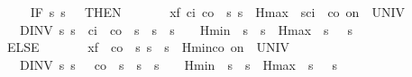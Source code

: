 \documentclass[envcountsame]{llncs}
\begin{document}
\begin{example}
\begin{isabellebody}
\ \ \ \ %
\isanewline
\ \ \ \ {\isacharparenleft}IF\ {\isacharparenleft}{\isasymlambda}s{\isachardot}\ s{\isachardollar}{}\ {\isacharequal}\ {}{\isacharparenright}\ THEN\ \isanewline
\ \ \ \ \ \ {\isacharparenleft}x{\isasymacute}{\isacharequal}{\isacharparenleft}f\ c\isactrlsub i\ c\isactrlsub o{\isacharparenright}\ {\isacharampersand}\ {\isacharparenleft}{\isasymlambda}s{\isachardot}\ s{\isachardollar}{}\ {\isasymle}\ {\isacharparenleft}Hmax\ {\isacharminus}\ s{\isachardollar}{}{\isacharparenright}{\isacharslash}{\isacharparenleft}c\isactrlsub i\ {\isacharminus}\ c\isactrlsub o{\isacharparenright}{\isacharparenright}\ on\ {\isacharbraceleft}{}{\isachardot}{\isachardot}{\isasymtau}{\isacharbraceright}\ UNIV\ {\isacharat}\ {}\isanewline
\ \ \ \ \ \ \ DINV\ {\isacharparenleft}{\isasymlambda}s{\isachardot}\ s{\isachardollar}{}\ {\isacharequal}\ {\isacharparenleft}{\isacharparenleft}c\isactrlsub i\ {\isacharminus}\ c\isactrlsub o{\isacharparenright}{\isacharparenright}\ {\isacharasterisk}\ s{\isachardollar}{}\ {\isacharplus}\ s{\isachardollar}{}\ {\isasymand}\ s{\isachardollar}{}\ {\isasymge}\ {}\ {\isasymand}\ Hmin\ {\isasymle}\ s{\isachardollar}{}\ {\isasymand}\ s{\isachardollar}{}\ {\isasymle}\ Hmax\ {\isasymand}\ {\isacharparenleft}s{\isachardollar}{}\ {\isacharequal}{}\ {\isasymor}\ s{\isachardollar}{}\ {\isacharequal}\ {}{\isacharparenright}{\isacharparenright}{\isacharparenright}\ \isanewline
\ \ \ \ \ ELSE\ \isanewline
\ \ \ \ \ \ {\isacharparenleft}x{\isasymacute}{\isacharequal}{\isacharparenleft}f\ {}\ c\isactrlsub o{\isacharparenright}\ {\isacharampersand}\ {\isacharparenleft}{\isasymlambda}s{\isachardot}\ s{\isachardollar}{}\ {\isasymle}\ {\isacharparenleft}s{\isachardollar}{}\ {\isacharminus}\ Hmin{\isacharparenright}{\isacharslash}c\isactrlsub o{\isacharparenright}\ on\ {\isacharbraceleft}{}{\isachardot}{\isachardot}{\isasymtau}{\isacharbraceright}\ UNIV\ {\isacharat}\ {}\isanewline
\ \ \ \ \ \ \ DINV\ {\isacharparenleft}{\isasymlambda}s{\isachardot}\ s{\isachardollar}{}\ {\isacharequal}\ {\isacharparenleft}{\isacharminus}\ c\isactrlsub o{\isacharparenright}\ {\isacharasterisk}\ s{\isachardollar}{}\ {\isacharplus}\ s{\isachardollar}{}\ {\isasymand}\ s{\isachardollar}{}\ {\isasymge}\ {}\ {\isasymand}\ Hmin\ {\isasymle}\ s{\isachardollar}{}\ {\isasymand}\ s{\isachardollar}{}\ {\isasymle}\ Hmax\ {\isasymand}\ {\isacharparenleft}s{\isachardollar}{}\ {\isacharequal}{}\ {\isasymor}\ s{\isachardollar}{}\ {\isacharequal}\ {}{\isacharparenright}{\isacharparenright}{\isacharparenright}{\isacharparenright}\ {\isacharparenright}\isanewline

\end{isabellebody}
\end{example}
\end{document}
